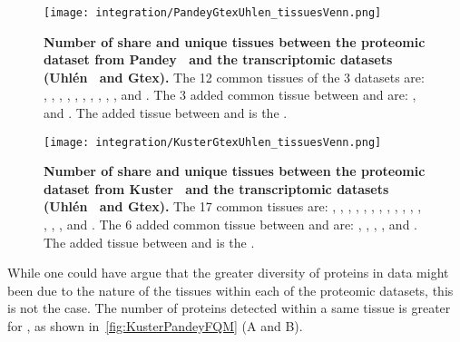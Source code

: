 \begin{figure}[!htbp]
    \texttt{[image: integration/PandeyGtexUhlen\_tissuesVenn.png]}
    \centering
    \caption[Number of share and unique tissues between the proteomic
    dataset from Pandey \etal\ and the transcriptomic datasets (Uhlén \etal\ and
    Gtex)]{\label{fig:VennTissuePandeyGtexUhlen}\textbf{Number of share and unique
    tissues between the proteomic dataset from Pandey \etal\ and the
    transcriptomic datasets (Uhlén \etal\ and Gtex).} The 12 common tissues of
    the 3 datasets are:
    , , , ,
    , , , , ,
    ,  and . The 3 added common
    tissue between  and  are:
    ,  and . The added tissue
    between  and  is the .}
\end{figure}

\begin{figure}[!htbp]
    \texttt{[image: integration/KusterGtexUhlen\_tissuesVenn.png]}
    \centering
    \caption[Number of share and unique tissues between the proteomic dataset
    from Kuster \etal\ and the transcriptomic datasets (Uhlén \etal\ and
    Gtex)]{\label{fig:VennTissueKusterGtexUhlen}\textbf{Number of share and unique
    tissues between the proteomic dataset from Kuster \etal\ and the
    transcriptomic datasets (Uhlén \etal\ and Gtex).} The 17 common tissues are:
    , , ,  ,
    , , , ,
    , , , ,
    , , ,  and
    . The 6 added common tissue between  and
     are: , ,
    , ,  and .
    The added tissue between  and  is the
    .}
\end{figure}

While one could have argue that the greater diversity of proteins in
 data might been due to the nature of the tissues within
each of the proteomic datasets, this is not the case. The number of proteins
detected within a same tissue is greater for  ,
as shown in~\cref{fig:KusterPandeyFQM} (A and B).

